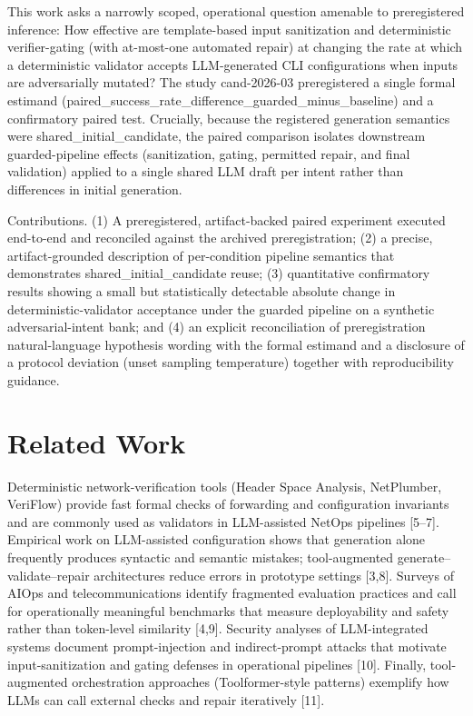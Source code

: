 \documentclass[conference]{IEEEtran}
\begin{document}
This work asks a narrowly scoped, operational question amenable to preregistered inference: How effective are template-based input sanitization and deterministic verifier-gating (with at-most-one automated repair) at changing the rate at which a deterministic validator accepts LLM-generated CLI configurations when inputs are adversarially mutated? The study cand-2026-03 preregistered a single formal estimand (paired\_success\_rate\_difference\_guarded\_minus\_baseline) and a confirmatory paired test. Crucially, because the registered generation semantics were shared\_initial\_candidate, the paired comparison isolates downstream guarded-pipeline effects (sanitization, gating, permitted repair, and final validation) applied to a single shared LLM draft per intent rather than differences in initial generation.

Contributions. (1) A preregistered, artifact-backed paired experiment executed end-to-end and reconciled against the archived preregistration; (2) a precise, artifact-grounded description of per-condition pipeline semantics that demonstrates shared\_initial\_candidate reuse; (3) quantitative confirmatory results showing a small but statistically detectable absolute change in deterministic-validator acceptance under the guarded pipeline on a synthetic adversarial-intent bank; and (4) an explicit reconciliation of preregistration natural-language hypothesis wording with the formal estimand and a disclosure of a protocol deviation (unset sampling temperature) together with reproducibility guidance.

\section{Related Work}
Deterministic network-verification tools (Header Space Analysis, NetPlumber, VeriFlow) provide fast formal checks of forwarding and configuration invariants and are commonly used as validators in LLM-assisted NetOps pipelines [5--7]. Empirical work on LLM-assisted configuration shows that generation alone frequently produces syntactic and semantic mistakes; tool-augmented generate--validate--repair architectures reduce errors in prototype settings [3,8]. Surveys of AIOps and telecommunications identify fragmented evaluation practices and call for operationally meaningful benchmarks that measure deployability and safety rather than token-level similarity [4,9]. Security analyses of LLM-integrated systems document prompt-injection and indirect-prompt attacks that motivate input-sanitization and gating defenses in operational pipelines [10]. Finally, tool-augmented orchestration approaches (Toolformer-style patterns) exemplify how LLMs can call external checks and repair iteratively [11].
\end{document}
